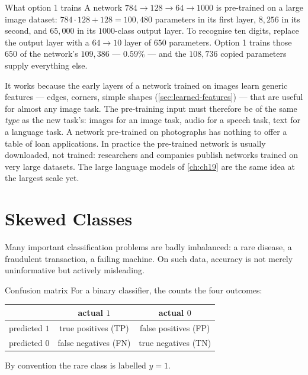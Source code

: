 \begin{workedexample}{What option 1 trains}
A network $784 \to 128 \to 64 \to 1000$ is pre-trained on a large image dataset:
$784\cdot128 + 128 = 100{,}480$ parameters in its first layer, $8{,}256$ in its
second, and $65{,}000$ in its $1000$-class output layer. To recognise ten digits,
replace the output layer with a $64\to10$ layer of $650$ parameters. Option 1
trains those $650$ of the network's $109{,}386$ --- $0.59\%$ --- and the
$108{,}736$ copied parameters supply everything else.
\end{workedexample}

It works because the early layers of a network trained on images learn generic
features --- edges, corners, simple shapes (\cref{sec:learned-features}) --- that
are useful for almost any image task. The pre-training input must therefore be
of the same \emph{type} as the new task's: images for an image task, audio for a
speech task, text for a language task. A network pre-trained on photographs has
nothing to offer a table of loan applications. In practice the pre-trained
network is usually downloaded, not trained: researchers and companies publish
networks trained on very large datasets. The large language models of
\cref{ch:ch19} are the same idea at the largest scale yet.

\section{Skewed Classes}
\label{sec:skew}

Many important classification problems are badly imbalanced: a rare disease, a
fraudulent transaction, a failing machine. On such data, accuracy is not merely
uninformative but actively misleading.

\begin{defbox}{Confusion matrix}
For a binary classifier, the  counts the four outcomes:

\begin{center}
\small
\renewcommand{\arraystretch}{1.25}
\begin{tabular}{@{}l|cc@{}}
 & actual $1$ & actual $0$\\
\hline
predicted $1$ & true positives (TP) & false positives (FP)\\
predicted $0$ & false negatives (FN) & true negatives (TN)\\
\end{tabular}
\end{center}
By convention the rare class is labelled $y = 1$.
\end{defbox}

